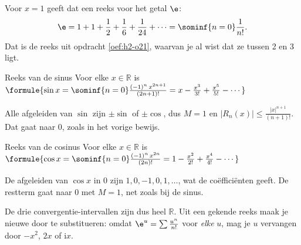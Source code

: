 Voor $x = 1$ geeft dat een reeks voor het getal $\e$:
\[ \e = 1 + 1 + \frac12 + \frac16 + \frac1{24} + \cdots = \sominf{n=0} \frac{1}{n!} . \]
Dat is de reeks uit opdracht \ref{oef:h2-o21}, waarvan je al wist dat ze tussen 2 en 3 ligt.

\begin{theorie}
\begin{stelling}{Reeks van de sinus}
Voor elke $x \in \mathbb{R}$ is \quad $\formule{\sin x = \sominf{n=0} \frac{(-1)^n\,x^{2n+1}}{(2n+1)!} = x - \frac{x^3}{3!} + \frac{x^5}{5!} - \cdots}$
\end{stelling}

\begin{bewijs}
Alle afgeleiden van $\sin$ zijn $\pm\sin$ of $\pm\cos$, dus $M = 1$ en $|R_n(x)| \leqslant \tfrac{|x|^{n+1}}{(n+1)!}$. Dat gaat naar 0, zoals in het vorige bewijs.
\end{bewijs}
\end{theorie}

\begin{theorie}
\begin{stelling}{Reeks van de cosinus}
Voor elke $x \in \mathbb{R}$ is \quad $\formule{\cos x = \sominf{n=0} \frac{(-1)^n\,x^{2n}}{(2n)!} = 1 - \frac{x^2}{2!} + \frac{x^4}{4!} - \cdots}$
\end{stelling}

\begin{bewijs}
De afgeleiden van $\cos x$ in 0 zijn $1, 0, -1, 0, 1, \ldots$, wat de coëfficiënten geeft. De restterm gaat naar 0 met $M = 1$, net zoals bij de sinus.
\end{bewijs}
\end{theorie}

De drie convergentie-intervallen zijn dus heel $\mathbb{R}$. Uit een gekende reeks maak je nieuwe door te substitueren: omdat $\e^u = \sum \tfrac{u^n}{n!}$ voor \textit{elke} $u$, mag je $u$ vervangen door $-x^2$, $2x$ of $\mathrm{i}x$.


